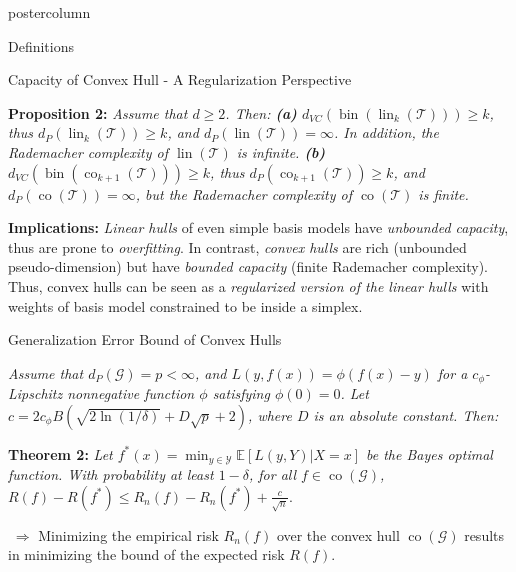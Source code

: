 \documentclass{beamer}
\newcommand{\E}{{\mathbb E}}
\newcommand{\setG}{{\mathcal G}}
\newcommand{\setT}{{\mathcal T}}
\newcommand{\setY}{{\mathcal Y}}
\DeclareMathOperator{\conv}{co}
\DeclareMathOperator{\lin}{lin}
\DeclareMathOperator{\bin}{bin}
\begin{document}
\begin{frame}
\begin{columns}
\begin{column}{.37\textwidth}
\begin{beamercolorbox}[center]{postercolumn}
\begin{minipage}{.98\textwidth}
{\begin{myblock}{Definitions}
\begin{itemize}
\end{itemize}

\end{myblock}\vfill

\begin{myblock}{Capacity of Convex Hull - A Regularization Perspective}

\RaggedRight
{\color{blue}\textbf{Proposition 2:}}
\emph{
Assume that $d \ge 2$. Then: 
{\color{blue}\textbf{(a)}}
	$d_{VC}(\bin(\lin_{k}(\setT))) \ge k$, thus 
	$d_{P}(\lin_{k}(\setT)) \ge k$, 
	and $d_{P}(\lin(\setT)) = \infty$.
	In addition, the Rademacher complexity of $\lin(\setT)$ is {\color{blue}infinite}.
{\color{blue}\textbf{(b)}}
	$d_{VC}(\bin(\conv_{k+1}(\setT))) \ge k$, thus
	$d_{P}(\conv_{k+1}(\setT)) \ge k$, and 
	$d_{P}(\conv(\setT)) = \infty$, but the Rademacher complexity of
	$\conv(\setT)$ is {\color{blue}finite}.
}

\vspace{0.3em}
{\color{blue}\textbf{Implications:}} 
\emph{Linear hulls} of even simple basis models have \emph{unbounded capacity}, thus are prone to \emph{overfitting}. In contrast, \emph{convex hulls} are rich (unbounded pseudo-dimension) but have \emph{bounded capacity} (finite Rademacher complexity). Thus, convex hulls can be seen as a \emph{regularized version of the linear hulls} with weights of basis model constrained to be inside a simplex. 

\end{myblock}\vfill

\begin{myblock}{Generalization Error Bound of Convex Hulls}

\RaggedRight
\emph{Assume that $d_{P}(\setG) = p < \infty$, and 
	$L(y, f(x)) = \phi(f(x) - y)$ for a $c_{\phi}$-Lipschitz nonnegative function
	$\phi$ satisfying $\phi(0) = 0$. Let $c = {2 c_{\phi} B \left(\sqrt{2 \ln(1/\delta)} + D\sqrt{p} + 2\right)}$, where $D$ is an absolute constant. Then:}

\vspace{0.3em}
{\color{blue}\textbf{Theorem 2:}} 
\emph{Let $f^{*}(x) = \min_{y \in \setY} \E [L(y, Y) | X=x]$
be the Bayes optimal function. With probability at least $1 - \delta$, for all $f \in \conv(\setG)$,} 
{\color{blue}$ R(f) - R(f^{*}) \le R_{n} (f) - R_{n}(f^{*})  + \frac{c}{\sqrt{n}}$.}

$\;\Longrightarrow$ Minimizing the empirical risk $R_n(f)$ over the convex hull $\conv(\setG)$ results in minimizing the bound of the expected risk $R(f)$. 


\end{myblock}}
\end{minipage}
\end{beamercolorbox}
\end{column}
\end{columns}
\end{frame}
\end{document}
